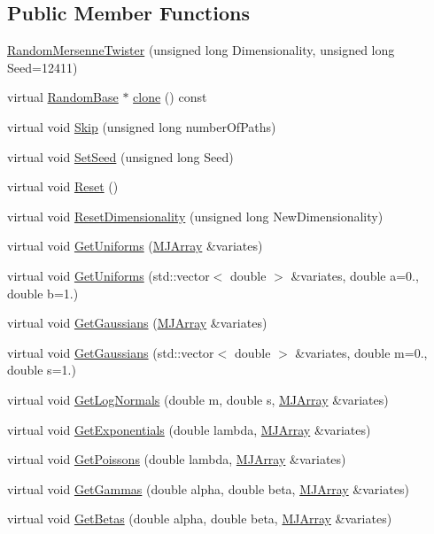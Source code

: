 \subsection*{Public Member Functions}
\begin{DoxyCompactItemize}
\item 
\hyperlink{classRandomMersenneTwister_ae9e37bfd7c85c150b68ab3fbe243bb7a}{Random\+Mersenne\+Twister} (unsigned long Dimensionality, unsigned long Seed=12411)
\item 
virtual \hyperlink{classRandomBase}{Random\+Base} $\ast$ \hyperlink{classRandomMersenneTwister_a0faf486ea7b17d013b3165ac9fc8171d}{clone} () const
\item 
virtual void \hyperlink{classRandomMersenneTwister_a624044e5b2516f7947382ab38911b4a5}{Skip} (unsigned long number\+Of\+Paths)
\item 
virtual void \hyperlink{classRandomMersenneTwister_ac03508508fce508b21a53ce0739b061b}{Set\+Seed} (unsigned long Seed)
\item 
virtual void \hyperlink{classRandomMersenneTwister_aac2add88779d014d7722a3bfe9eed219}{Reset} ()
\item 
virtual void \hyperlink{classRandomMersenneTwister_a5fdeed1a2eaabf7b61241b6f850cbaf1}{Reset\+Dimensionality} (unsigned long New\+Dimensionality)
\item 
virtual void \hyperlink{classRandomMersenneTwister_afd574ab3efab7a722a230bfc5680dea8}{Get\+Uniforms} (\hyperlink{classMJArray}{M\+J\+Array} \&variates)
\item 
virtual void \hyperlink{classRandomMersenneTwister_a6ee46c33d00d07921765033a9b0c471a}{Get\+Uniforms} (std\+::vector$<$ double $>$ \&variates, double a=0., double b=1.)
\item 
virtual void \hyperlink{classRandomMersenneTwister_a550207d622d23ae8229b0953868bd65d}{Get\+Gaussians} (\hyperlink{classMJArray}{M\+J\+Array} \&variates)
\item 
virtual void \hyperlink{classRandomMersenneTwister_a8c76146a5c73d6396f35fd72cbaa1f08}{Get\+Gaussians} (std\+::vector$<$ double $>$ \&variates, double m=0., double s=1.)
\item 
virtual void \hyperlink{classRandomMersenneTwister_a138aef807030513957f98abe6235e791}{Get\+Log\+Normals} (double m, double s, \hyperlink{classMJArray}{M\+J\+Array} \&variates)
\item 
virtual void \hyperlink{classRandomMersenneTwister_add67fcdb019b8f0eb43c50d3cdf1f8c1}{Get\+Exponentials} (double lambda, \hyperlink{classMJArray}{M\+J\+Array} \&variates)
\item 
virtual void \hyperlink{classRandomMersenneTwister_a7b53f211616ce5764705b192fbc0a009}{Get\+Poissons} (double lambda, \hyperlink{classMJArray}{M\+J\+Array} \&variates)
\item 
virtual void \hyperlink{classRandomMersenneTwister_a6bc8dbc22f258488161f800580574c0f}{Get\+Gammas} (double alpha, double beta, \hyperlink{classMJArray}{M\+J\+Array} \&variates)
\item 
virtual void \hyperlink{classRandomMersenneTwister_aac61b45bc4e003cad863d39e8333a434}{Get\+Betas} (double alpha, double beta, \hyperlink{classMJArray}{M\+J\+Array} \&variates)
\end{DoxyCompactItemize}


